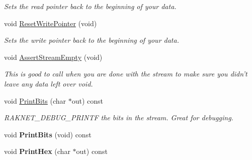\begin{DoxyCompactItemize}
\begin{DoxyCompactList}\small\item\em Sets the read pointer back to the beginning of your data. \end{DoxyCompactList}\item 
\hypertarget{class_rak_net_1_1_bit_stream_a9254b23b2873496aab84d2637d7488ee}{void \hyperlink{class_rak_net_1_1_bit_stream_a9254b23b2873496aab84d2637d7488ee}{Reset\-Write\-Pointer} (void)}\label{class_rak_net_1_1_bit_stream_a9254b23b2873496aab84d2637d7488ee}

\begin{DoxyCompactList}\small\item\em Sets the write pointer back to the beginning of your data. \end{DoxyCompactList}\item 
\hypertarget{class_rak_net_1_1_bit_stream_a8492d958d2527a14813cc1a22a71b83a}{void \hyperlink{class_rak_net_1_1_bit_stream_a8492d958d2527a14813cc1a22a71b83a}{Assert\-Stream\-Empty} (void)}\label{class_rak_net_1_1_bit_stream_a8492d958d2527a14813cc1a22a71b83a}

\begin{DoxyCompactList}\small\item\em This is good to call when you are done with the stream to make sure you didn't leave any data left over void. \end{DoxyCompactList}\item 
\hypertarget{class_rak_net_1_1_bit_stream_a74cf3e238c0925fdbeb7b792a2f79626}{void \hyperlink{class_rak_net_1_1_bit_stream_a74cf3e238c0925fdbeb7b792a2f79626}{Print\-Bits} (char $\ast$out) const }\label{class_rak_net_1_1_bit_stream_a74cf3e238c0925fdbeb7b792a2f79626}

\begin{DoxyCompactList}\small\item\em R\-A\-K\-N\-E\-T\-\_\-\-D\-E\-B\-U\-G\-\_\-\-P\-R\-I\-N\-T\-F the bits in the stream. Great for debugging. \end{DoxyCompactList}\item 
\hypertarget{class_rak_net_1_1_bit_stream_a1c41eddc904da8d680de569407b37003}{void {\bfseries Print\-Bits} (void) const }\label{class_rak_net_1_1_bit_stream_a1c41eddc904da8d680de569407b37003}

\item 
\hypertarget{class_rak_net_1_1_bit_stream_ae7f62cc0bf462453f68e206d46aa6e2c}{void {\bfseries Print\-Hex} (char $\ast$out) const }\label{class_rak_net_1_1_bit_stream_ae7f62cc0bf462453f68e206d46aa6e2c}


\end{DoxyCompactItemize}
